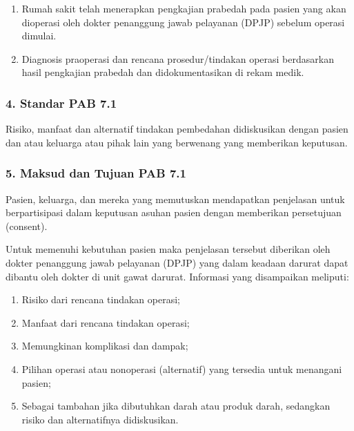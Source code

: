 \documentclass[
]{book}
\providecommand{\tightlist}{%
  \setlength{\itemsep}{0pt}\setlength{\parskip}{0pt}}
\begin{document}
\begin{enumerate}
\def\labelenumi{\alph{enumi}.}
\tightlist
\item
  Rumah sakit telah menerapkan pengkajian prabedah pada pasien yang akan dioperasi oleh dokter penanggung jawab pelayanan (DPJP) sebelum operasi dimulai.
\item
  Diagnosis praoperasi dan rencana prosedur/tindakan operasi berdasarkan hasil pengkajian prabedah dan didokumentasikan di rekam medik.
\end{enumerate}

\hypertarget{standar-pab-7.1}{%
\subsubsection*{4. Standar PAB 7.1}\label{standar-pab-7.1}}

Risiko, manfaat dan alternatif tindakan pembedahan didiskusikan dengan pasien dan atau keluarga atau pihak lain yang berwenang yang memberikan keputusan.

\hypertarget{maksud-dan-tujuan-pab-7.1}{%
\subsubsection*{5. Maksud dan Tujuan PAB 7.1}\label{maksud-dan-tujuan-pab-7.1}}

Pasien, keluarga, dan mereka yang memutuskan mendapatkan penjelasan untuk berpartisipasi dalam keputusan asuhan pasien dengan memberikan persetujuan (consent).

Untuk memenuhi kebutuhan pasien maka penjelasan tersebut diberikan oleh dokter penanggung jawab pelayanan (DPJP) yang dalam keadaan darurat dapat dibantu oleh dokter di unit gawat darurat. Informasi yang disampaikan meliputi:

\begin{enumerate}
\def\labelenumi{\alph{enumi}.}
\tightlist
\item
  Risiko dari rencana tindakan operasi;
\item
  Manfaat dari rencana tindakan operasi;
\item
  Memungkinan komplikasi dan dampak;
\item
  Pilihan operasi atau nonoperasi (alternatif) yang tersedia untuk menangani pasien;
\item
  Sebagai tambahan jika dibutuhkan darah atau produk darah, sedangkan risiko dan alternatifnya didiskusikan.
\end{enumerate}
\end{document}
